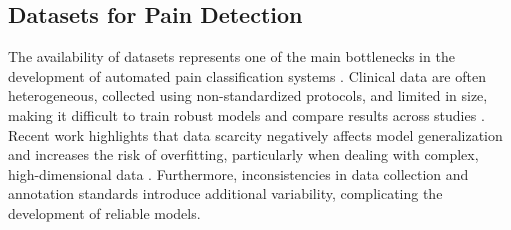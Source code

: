 \documentclass[preprint,12pt,authoryear]{elsarticle}
\begin{document}
\subsection{Datasets for Pain Detection}
The availability of datasets represents one of the main bottlenecks in the development of automated pain classification systems \citep{taati2025synpain}. Clinical data are often heterogeneous, collected using non-standardized protocols, and limited in size, making it difficult to train robust models and compare results across studies \citep{hassan2019automatic}. Recent work highlights that data scarcity negatively affects model generalization and increases the risk of overfitting, particularly when dealing with complex, high-dimensional data \citep{cascella2026linking}. Furthermore, inconsistencies in data collection and annotation standards introduce additional variability, complicating the development of reliable models.
\end{document}

